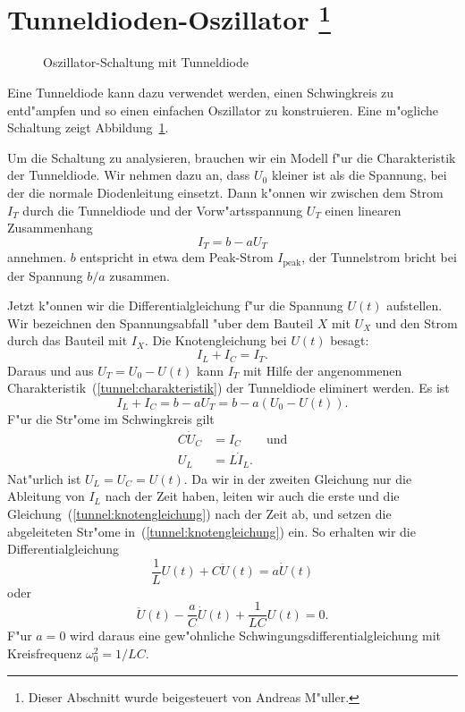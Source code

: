 %
%
%
\section[Tunneldioden-Oszillator]{Tunneldioden-Oszillator%
\protect\footnote{Dieser Abschnitt wurde beigesteuert von
Andreas M"uller.}
\label{tunnel:oszillator}}
\begin{figure}
\centering

\caption{Oszillator-Schaltung mit Tunneldiode
\label{tunnel:tunneldioden-oszillator}}
\end{figure}
Eine Tunneldiode kann dazu verwendet werden, einen Schwingkreis zu
entd"ampfen und so einen einfachen Oszillator zu konstruieren.
Eine m"ogliche Schaltung zeigt Abbildung~\ref{tunnel:tunneldioden-oszillator}.

Um die Schaltung zu analysieren, brauchen wir ein Modell f"ur die
Charakteristik der Tunneldiode. Wir nehmen dazu an, dass $U_0$ kleiner
ist als die Spannung, bei der die normale Diodenleitung einsetzt.
Dann k"onnen wir zwischen dem Strom $I_T$ durch die Tunneldiode
und der Vorw"artsspannung $U_T$ einen linearen Zusammenhang
\begin{equation}
I_T=b-aU_T
\label{tunnel:charakteristik}
\end{equation}
annehmen. $b$ entspricht in etwa dem Peak-Strom $I_{\text{peak}}$, der
Tunnelstrom bricht bei der Spannung $b/a$ zusammen.

Jetzt k"onnen wir die Differentialgleichung f"ur die Spannung $U(t)$
aufstellen. Wir bezeichnen den Spannungsabfall "uber dem Bauteil $X$
mit $U_X$ und den Strom durch das Bauteil mit $I_X$. Die Knotengleichung
bei $U(t)$ besagt:
\[
I_L+I_C=I_T.
\]
Daraus und aus $U_T=U_0-U(t)$ kann $I_T$ mit Hilfe der angenommenen
Charakteristik~(\ref{tunnel:charakteristik}) der Tunneldiode eliminert werden.
Es ist
\begin{equation}
I_L+I_C=b-aU_T=b-a(U_0-U(t)).
\label{tunnel:knotengleichung}
\end{equation}
F"ur die Str"ome im Schwingkreis gilt
\begin{align*}
C\dot U_C&=I_C \qquad\text{und}\\
U_L&=L\dot I_L.
\end{align*}
Nat"urlich ist $U_L=U_C=U(t)$.
Da wir in der zweiten Gleichung nur die Ableitung von $I_L$ nach
der Zeit haben, leiten wir
auch die erste und die Gleichung~(\ref{tunnel:knotengleichung}) nach
der Zeit ab, und setzen die abgeleiteten Str"ome
in~(\ref{tunnel:knotengleichung}) ein.
So erhalten wir die Differentialgleichung
\begin{equation*}
\frac1{L}U(t) +C\ddot U(t)=a\dot U(t)
\end{equation*}
oder
\begin{equation}
\ddot U(t)
-\frac{a}{C}\dot U(t)
+\frac1{LC}U(t)
=0.
\label{tunnel:dgl1}
\end{equation}
F"ur $a=0$ wird daraus eine gew"ohnliche Schwingungsdifferentialgleichung
mit Kreisfrequenz $\omega_0^2=1/LC$.

